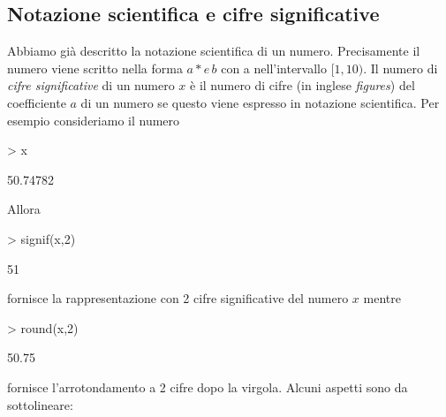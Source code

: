 \documentclass[onecolumn,11pt]{book}
\begin{document}
\subsection{Notazione scientifica e cifre significative}
Abbiamo gi\`a descritto la notazione scientifica di un numero.  Precisamente  il numero viene scritto nella forma $a*e \,b$ con a nell'intervallo $[1,10)$.
Il numero di \emph{cifre significative}  di un numero $x$ \`e  il numero di cifre (in inglese \emph{figures}) del coefficiente $a$ di un  numero se questo viene espresso in notazione scientifica. 
Per esempio consideriamo il numero 
\begin{Schunk}
\begin{Sinput}
> x
\end{Sinput}
\begin{Soutput}
[1] 50.74782
\end{Soutput}
\end{Schunk}
Allora
\begin{Schunk}
\begin{Sinput}
> signif(x,2)
\end{Sinput}
\begin{Soutput}
[1] 51
\end{Soutput}
\end{Schunk}
fornisce la rappresentazione con 2 cifre significative del numero $x$ mentre
\begin{Schunk}
\begin{Sinput}
> round(x,2)
\end{Sinput}
\begin{Soutput}
[1] 50.75
\end{Soutput}
\end{Schunk}
fornisce l'arrotondamento a 2 cifre dopo la virgola. Alcuni aspetti sono da sottolineare: 
\end{document}

